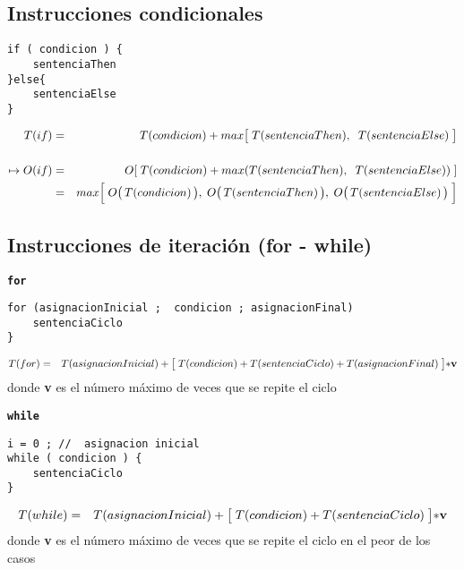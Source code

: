 \subsection{Instrucciones condicionales}
\label{sec:instr-cond}

\begin{verbatim}
if ( condicion ) {
    sentenciaThen
}else{
    sentenciaElse
}
\end{verbatim} 


\begin{eqnarray*}
  T(if) &=& T ( condicion ) + max \bigl[ \;T ( sentenciaThen ), \;\;T (sentenciaElse) \;\bigr]\\
  \\
  \mapsto O(if) &=& O[\; T ( condicion ) + max ( T ( sentenciaThen ), \;\;T (sentenciaElse) )\;]\\
  &=& max \Bigl[\; O\bigl(\,T ( condicion )\,\bigr), \;O\bigl(\, T ( sentenciaThen )\,\bigr), \;O\bigl(\,T (sentenciaElse)\,\bigr) \;\Bigr]
\end{eqnarray*}

\subsection{Instrucciones de iteración (for - while) }
\label{sec:instr-de-iter}


\begin{alltt}
{\bf for}
\end{alltt}

\begin{verbatim}
for (asignacionInicial ;  condicion ; asignacionFinal)
    sentenciaCiclo
}
\end{verbatim}

\begin{eqnarray*}
T( for ) &=& T (  asignacionInicial ) +   \bigl[\; T ( condicion ) + T ( sentenciaCiclo ) + T ( asignacionFinal ) \;\bigr] {\bf * v}
\end{eqnarray*}
donde \textbf{v}  es el número máximo de veces que se repite el ciclo

\begin{alltt}
{\bf while}
\end{alltt}

\begin{verbatim}
i = 0 ; //  asignacion inicial
while ( condicion ) {
    sentenciaCiclo
}
\end{verbatim}

\begin{eqnarray*}
  T( while ) &=& T ( asignacionInicial ) +   \bigl[ \;T ( condicion ) + T ( sentenciaCiclo ) \; \bigr] {\bf * v}
\end{eqnarray*}
donde \textbf{v} es el número máximo de veces que se repite el ciclo
en el peor de los casos



